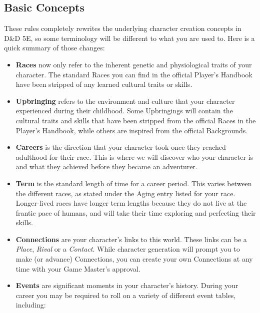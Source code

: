 \documentclass[10pt,twoside]{article}
\begin{document}
\begin{multicols}{2}
\tableofcontents
\columnbreak


\section{Basic Concepts}

These rules completely rewrites the underlying character creation concepts in D\&D 5E, so some terminology will be different to what you are used to. Here is a quick summary of those changes:

\begin{itemize}
\item \textbf{Races} now only refer to the inherent genetic and physiological traits of your character. The standard Races you can find in the official Player's Handbook have been stripped of any learned cultural traits or skills.
\item \textbf{Upbringing} refers to the environment and culture that your character experienced during their childhood. Some Upbringings will contain the cultural traits and skills that have been stripped from the official Races in the Player's Handbook, while others are inspired from the official Backgrounds.
\item \textbf{Careers} is the direction that your character took once they reached adulthood for their race. This is where we will discover who your character is and what they achieved before they became an adventurer.
\item \textbf{Term} is the standard length of time for a career period. This varies between the different races, as stated under the Aging entry listed for your race. Longer-lived races have longer term lengths because they do not live at the frantic pace of humans, and will take their time exploring and perfecting their skills.
\item \textbf{Connections} are your character's links to this world. These links can be a \textit{Place}, \textit{Rival} or a \textit{Contact}. While character generation will prompt you to make (or advance) Connections, you can create your own Connections at any time with your Game Master's approval.
\item \textbf{Events} are significant moments in your character’s history. During your career you may be required to roll on a variety of different event tables, including:
\begin{itemize}

\end{itemize}
\end{itemize}
\end{multicols}
\end{document}
